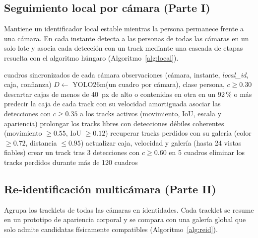 \documentclass[12pt,a4paper]{article}
\begin{document}
\subsection{Seguimiento local por cámara (Parte I)}

Mantiene un identificador local estable mientras la persona permanece frente a
una cámara. En cada instante detecta a las personas de todas las cámaras en un
solo lote y asocia cada detección con un track mediante una cascada de etapas
resuelta con el algoritmo húngaro (Algoritmo~\ref{alg:local}).

\begin{algorithm}[H]
\caption{Seguimiento local por cámara}
\label{alg:local}
\begin{algorithmic}[1]
\REQUIRE cuadros sincronizados de cada cámara
\ENSURE observaciones (cámara, instante, \textit{local\_id}, caja, confianza)
  \STATE $D \leftarrow$ YOLO26m(un cuadro por cámara), clase persona, $c \geq 0.30$
    \STATE descartar cajas de menos de 40~px de alto o contenidas en otra en un 92\,\% o más
    \STATE predecir la caja de cada track con su velocidad amortiguada
    \STATE asociar las detecciones con $c \geq 0.35$ a los tracks activos (movimiento, IoU, escala y apariencia)
    \STATE prolongar los tracks libres con detecciones débiles coherentes (movimiento $\geq 0.55$, IoU $\geq 0.12$)
    \STATE recuperar tracks perdidos con su galería (color $\geq 0.72$, distancia $\leq 0.95$)
    \STATE actualizar caja, velocidad y galería (hasta 24 vistas fiables)
    \STATE crear un track tras 3 detecciones con $c \geq 0.60$ en 5 cuadros
    \STATE eliminar los tracks perdidos durante más de 120 cuadros
  \ENDFOR
\ENDFOR
\end{algorithmic}
\end{algorithm}

\subsection{Re-identificación multicámara (Parte II)}

Agrupa los tracklets de todas las cámaras en identidades. Cada tracklet se
resume en un prototipo de apariencia corporal y se compara con una galería
global que solo admite candidatas físicamente compatibles
(Algoritmo~\ref{alg:reid}).
\end{document}

